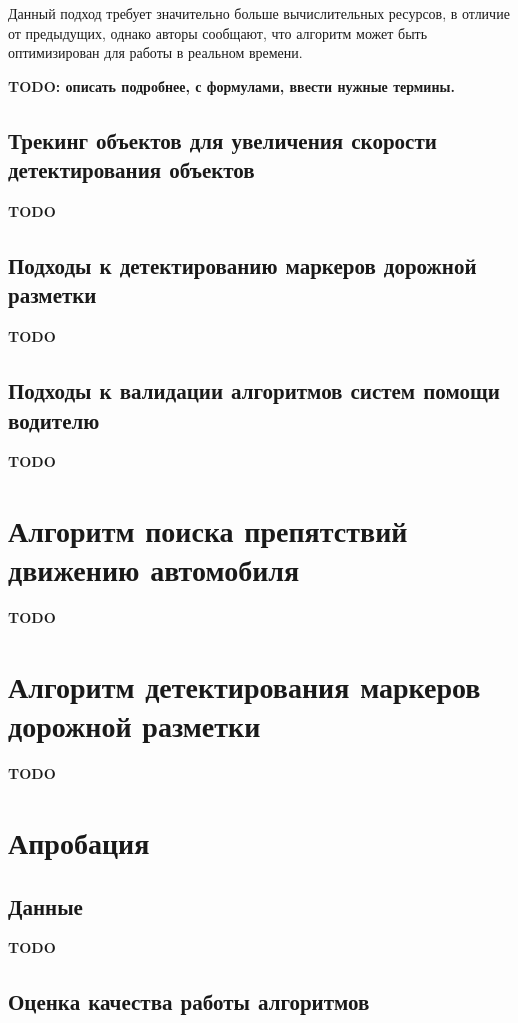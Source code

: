 \documentclass[aps,%
14pt,%
final,%
oneside,
onecolumn,%
musixtex, %
superscriptaddress,%
centertags]{extarticle} %
\begin{document}
Данный подход требует значительно больше вычислительных ресурсов, в отличие от предыдущих, однако авторы \cite{benenson2011stixels} сообщают, что алгоритм может быть оптимизирован для работы в реальном времени.

\textbf{\Large TODO: описать подробнее, с формулами, ввести нужные термины.}

\subsection{Трекинг объектов для увеличения скорости детектирования объектов}

\textbf{\Large TODO}

\subsection{Подходы к детектированию маркеров дорожной разметки}

\textbf{\Large TODO}

\subsection{Подходы к валидации алгоритмов систем помощи водителю}

\textbf{\Large TODO}

\section{Алгоритм поиска препятствий движению автомобиля}

\textbf{\Large TODO}

\section{Алгоритм детектирования маркеров дорожной разметки}

\textbf{\Large TODO}

\section{Апробация}

\subsection{Данные}

\textbf{\Large TODO}

\subsection{Оценка качества работы алгоритмов}
\end{document}
